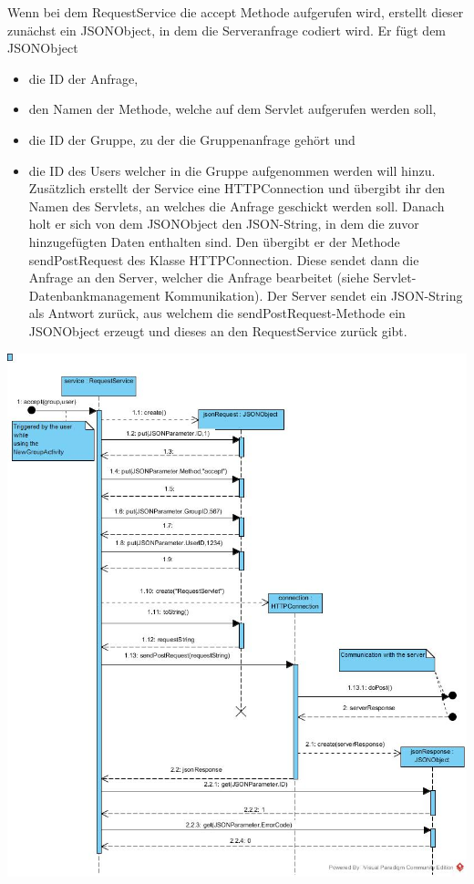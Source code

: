 Wenn bei dem RequestService die accept Methode aufgerufen wird, erstellt dieser zunächst ein JSONObject, in dem die Serveranfrage codiert wird. Er fügt dem JSONObject
\begin{itemize}
\item  die ID der Anfrage,
\item den Namen der Methode, welche auf dem Servlet aufgerufen werden soll,
\item die ID der Gruppe, zu der die Gruppenanfrage gehört und
\item die ID des Users welcher in die Gruppe aufgenommen werden will hinzu.
Zusätzlich erstellt der Service eine HTTPConnection und übergibt ihr den Namen des Servlets, an welches die Anfrage geschickt werden soll.
Danach holt er sich von dem JSONObject den JSON-String, in dem die zuvor hinzugefügten Daten enthalten sind. Den übergibt er der Methode sendPostRequest des Klasse HTTPConnection.
Diese sendet dann die Anfrage an den Server, welcher die Anfrage bearbeitet (\hypertarget{ServletDatenbank}{siehe Servlet-Datenbankmanagement Kommunikation}). Der Server sendet ein JSON-String als Antwort zurück, aus welchem die sendPostRequest-Methode ein JSONObject erzeugt und dieses an den RequestService zurück gibt.
\end{itemize}
\includegraphics[width=1.1\textwidth]{Service_ServerConnection.jpg}


